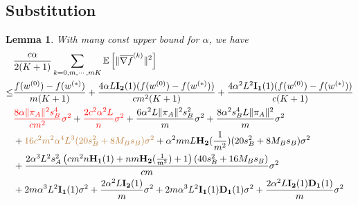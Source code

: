 \documentclass{article}
\newtheorem{lemma}[thm]{Lemma}
\newcommand{\EE}[1]{\mathbb{E}\left[#1\right]}
\newcommand{\norm}[1]{\| #1 \|}
\begin{document}
\subsection{Substitution}
\begin{lemma}
  With many const upper bound for $\alpha$, we have
  \begin{align*}
    &\frac{c\alpha }{2(K+1)}\sum_{k=0,m,\cdots,mK}\EE{\norm{\overline{\nabla f}^{(k)}}^2}
  \\\leq& \frac{f(w^{(0)})-f(w^{(*)})}{m(K+1)}+\frac{4\alpha L\mathbf{I_2}(1)(f(w^{(0)})- f(w^{(*)}))}{cm^2(K+1)}+\frac{4\alpha^2L^2\mathbf{I_1}(1)( f(w^{(0)})- f(w^{(*)}))}{c(K+1)}
  \\&\textcolor{red}{\frac{8\alpha \norm{\pi_A}^2s_B^4}{cm^2}\sigma^2}+\textcolor{red}{ \frac{2c^2\alpha^2L}{n}\sigma^2}+\frac{6\alpha^2L\norm{\pi_A}^2s_B^2}{m}\sigma^2+\frac{8\alpha^2s_B^4L\norm{\pi_A}^2}{m}\sigma^2\\&+\textcolor{brown}{16c^2m^2\alpha^4L^3(20s_B^2+8M_Bs_B)\sigma^2}+\alpha^2 mnL \mathbf{H_2}(\frac{1}{m^2})(20s_B^2+8M_Bs_B)\sigma^2\\ &+\frac{2\alpha^3 L^2s_A^2\left(cm^2n\mathbf{H_1}(1)+nm\mathbf{H_2}(\frac{1}{m^2})+1\right)(40s_B^2+16M_Bs_B)}{cm}\sigma^2\\&+2m\alpha^3L^2\mathbf{I_1}(1)\sigma^2+\frac{2\alpha^2L\mathbf{I_2}(1)}{m}\sigma^2
  +2m\alpha^3L^2\mathbf{I_1}(1)\mathbf{D_1}(1)\sigma^2
  +\frac{2\alpha^2L\mathbf{I_2}(1)\mathbf{D_1}(1)}{m}\sigma^2
  \end{align*} 
\end{lemma}
\end{document}
